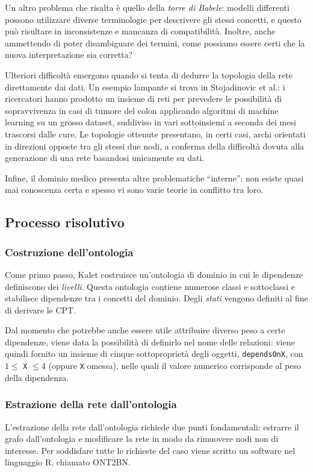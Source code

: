 Un altro problema che risalta è quello della \textit{torre di Babele}: modelli differenti possono utilizzare diverse terminologie per descrivere gli stessi concetti, e questo può risultare in inconsistenze e mancanza di compatibilità. Inoltre, anche ammettendo di poter disambiguare dei termini, come possiamo essere certi che la nuova interpretazione sia corretta? 

Ulteriori difficoltà emergono quando si tenta di dedurre la topologia della rete direttamente dai dati. Un esempio lampante si trova in Stojadinovic et al.\cite{stojadinovic2013clinical}: i ricercatori hanno prodotto un insieme di reti per prevedere le possibilità di sopravvivenza in casi di tumore del colon applicando algoritmi di machine learning su un grosso dataset, suddiviso in vari sottoinsiemi a seconda dei mesi trascorsi dalle cure.
Le topologie ottenute presentano, in certi casi, archi orientati in direzioni opposte tra gli stessi due nodi, a conferma della difficoltà dovuta alla generazione di una rete basandosi unicamente su dati.

Infine, il dominio medico presenta altre problematiche ``interne'': non esiste quasi mai conoscenza certa e spesso vi sono varie teorie in conflitto tra loro.


\subsection{Processo risolutivo}
\subsubsection{Costruzione dell'ontologia}
Come primo passo, Kalet costruisce un'ontologia di dominio in cui le dipendenze definiscono dei \textit{livelli}. Questa ontologia contiene numerose classi e sottoclassi e stabilisce dipendenze tra i concetti del dominio. Degli \textit{stati} vengono definiti al fine di derivare le CPT.

Dal momento che potrebbe anche essere utile attribuire diverso peso a certe dipendenze, viene data la possibilità di definirlo nel nome delle relazioni: viene quindi fornito un insieme di cinque sottoproprietà degli oggetti, \texttt{dependsOnX}, con $1 \le$ \texttt{X} $\le 4$ (oppure \texttt{X} omessa), nelle quali il valore numerico corrisponde al peso della dipendenza.


\subsubsection{Estrazione della rete dall'ontologia}
L'estrazione della rete dall'ontologia richiede due punti fondamentali: estrarre il grafo dall'ontologia e modificare la rete in modo da rimuovere nodi non di interesse\cite{kalet2017}. Per soddisfare tutte le richieste del caso viene scritto un software nel linguaggio R, chiamato ONT2BN.

